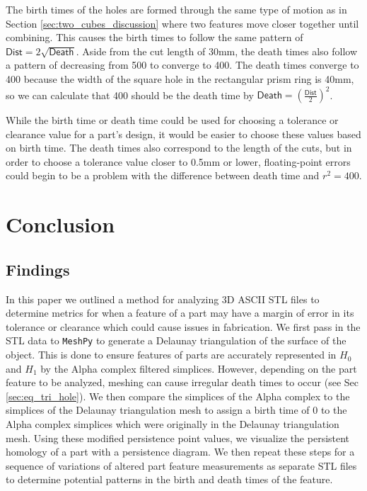 \documentclass[ma]{uncgdissertationexp}
\theoremstyle{plain}
\theoremstyle{definition}
\theoremstyle{remark}
\begin{document}
\par The birth times of the holes are formed through the same type of motion as in Section \ref{sec:two_cubes_discussion} where two features move closer together until combining. This causes the birth times to follow the same pattern of $\mathsf{Dist} = 2\sqrt{\mathsf{Death}}$. Aside from the cut length of 30mm, the death times also follow a pattern of decreasing from 500 to converge to 400. The death times converge to 400 because the width of the square hole in the rectangular prism ring is 40mm, so we can calculate that 400 should be the death time by $\mathsf{Death}=(\frac{\mathsf{Dist}}{2})^2$.
\par While the birth time or death time could be used for choosing a tolerance or clearance value for a part's design, it would be easier to choose these values based on birth time. The death times also correspond to the length of the cuts, but in order to choose a tolerance value closer to 0.5mm or lower, floating-point errors could begin to be a problem with the difference between death time and $r^{2} = 400$.
\chapter{Conclusion}

\section{Findings}\par In this paper we outlined a method for analyzing 3D ASCII STL files to determine metrics for when a feature of a part may have a margin of error in its tolerance or clearance which could cause issues in fabrication. We first pass in the STL data to \verb"MeshPy" to generate a Delaunay triangulation of the surface of the object. This is done to ensure features of parts are accurately represented in $H_{0}$ and $H_{1}$ by the Alpha complex filtered simplices. However, depending on the part feature to be analyzed, meshing can cause irregular death times to occur (see Sec \ref{sec:eq_tri_hole}). We then compare the simplices of the Alpha complex to the simplices of the Delaunay triangulation mesh to assign a birth time of 0 to the Alpha complex simplices which were originally in the Delaunay triangulation mesh. Using these modified persistence point values, we visualize the persistent homology of a part with a persistence diagram. We then repeat these steps for a sequence of variations of altered part feature measurements as separate STL files to determine potential patterns in the birth and death times of the feature.
\end{document}
